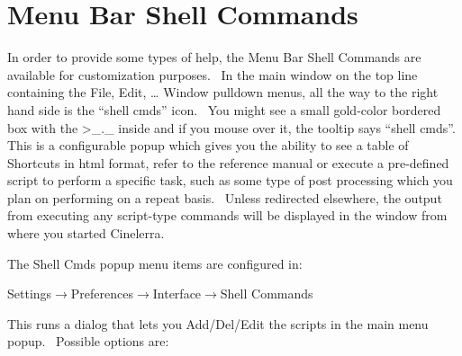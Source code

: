 \section{Menu Bar Shell Commands}%
\label{Menu Bar Shell Commands}

In order to provide some types of help, the Menu Bar Shell Commands are available for customization purposes. \ In the
main window on the top line containing the File, Edit, {\dots} Window pulldown menus, all the way to the right hand
side is the ``shell cmds'' icon. \ You might see a small gold-color bordered box with the {\textgreater}\_.\_ inside
and if you mouse over it, the tooltip says ``shell cmds''. This is a configurable popup which gives you the ability to
see a table of Shortcuts in html format, refer to the reference manual or execute a pre-defined script to perform a
specific task, such as some type of post processing which you plan on performing on a repeat basis. \ Unless redirected
elsewhere, the output from executing any script-type commands will be displayed in the window from where you started
Cinelerra.
\medskip

The Shell Cmds popup menu items are configured in:
\medskip

\hspace{10mm}Settings$\rightarrow$Preferences$\rightarrow$Interface$\rightarrow$Shell Commands
\medskip

This runs a dialog that lets you Add/Del/Edit the scripts in the main menu popup. \ Possible options are:\newline

